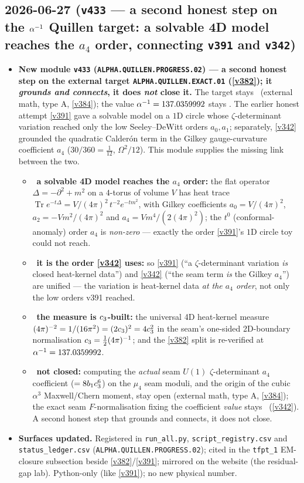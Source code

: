\subsection*{2026-06-27 (\texttt{v433} --- a second honest step on the $\alpha^{-1}$ Quillen target: a solvable 4D model reaches the $a_4$ order, connecting \texttt{v391} and \texttt{v342})}
\begin{itemize}
\item \textbf{New module \texttt{v433} (\texttt{ALPHA.QUILLEN.PROGRESS.02}) --- a second honest step on the
external target \texttt{ALPHA.QUILLEN.EXACT.01} (\vref{v382}); it \emph{grounds and connects}, it does
\emph{not} close it.} The target stays \mO\ (external math, type A, \vref{v384}); the value $\alpha^{-1}=137.0359992$
stays \mE. The earlier honest attempt \vref{v391} gave a solvable model on a $1$D circle whose
$\zeta$-determinant variation reached only the low Seeley--DeWitt orders $a_0,a_1$; separately, \vref{v342}
grounded the quadratic Calder\'on term in the Gilkey gauge-curvature coefficient $a_4$ ($30/360=\tfrac1{12}$,
$\Omega^2/12$). This module supplies the missing link between the two.
\begin{itemize}
\item \mE\ \textbf{a solvable 4D model reaches the $a_4$ order:} the flat operator $\Delta=-\partial^2+m^2$ on a
$4$-torus of volume $V$ has heat trace $\operatorname{Tr}e^{-t\Delta}=V/(4\pi)^2\,t^{-2}e^{-tm^2}$, with Gilkey
coefficients $a_0=V/(4\pi)^2$, $a_2=-Vm^2/(4\pi)^2$ and $a_4=Vm^4/(2(4\pi)^2)$; the $t^0$ (conformal-anomaly)
order $a_4$ is \emph{non-zero} --- exactly the order \vref{v391}'s $1$D circle toy could not reach.
\item \mE\ \textbf{it is the order \vref{v342} uses:} so \vref{v391} (``a $\zeta$-determinant variation \emph{is}
closed heat-kernel data'') and \vref{v342} (``the seam term \emph{is} the Gilkey $a_4$'') are unified --- the
variation is heat-kernel data \emph{at the $a_4$ order}, not only the low orders v391 reached.
\item \mE\ \textbf{the measure is $c_3$-built:} the universal 4D heat-kernel measure
$(4\pi)^{-2}=1/(16\pi^2)=(2c_3)^2=4c_3^2$ in the seam's one-sided 2D-boundary normalisation
$c_3=\tfrac12(4\pi)^{-1}$; and the \vref{v382} split is re-verified at $\alpha^{-1}=137.0359992$.
\item \mO\ \textbf{not closed:} computing the \emph{actual} seam $U(1)$ $\zeta$-determinant $a_4$ coefficient
($=8b_1c_3^6$) on the $\mu_4$ seam moduli, and the origin of the cubic $\alpha^3$ Maxwell/Chern moment, stay
open (external math, type A, \vref{v384}); the exact seam $F$-normalisation fixing the coefficient \emph{value}
stays \mC\ (\vref{v342}). A second honest step that grounds and connects, it does not close.
\end{itemize}
\item \textbf{Surfaces updated.} Registered in \texttt{run\_all.py}, \texttt{script\_registry.csv} and
\texttt{status\_ledger.csv} (\texttt{ALPHA.QUILLEN.PROGRESS.02}); cited in the \texttt{tfpt\_1} EM-closure
subsection beside \vref{v382}/\vref{v391}; mirrored on the website (the residual-gap lab). Python-only (like
\vref{v391}); no new physical number.
\end{itemize}

